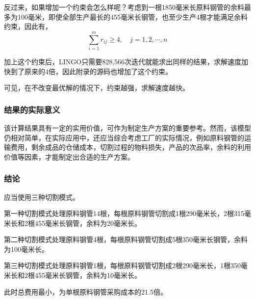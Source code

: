 反过来，如果增加一个约束会怎么样呢？考虑到一根1850毫米长原料钢管的余料最多为100毫米，即使全部生产最长的455毫米长钢管，也至少生产4根才能满足余料约束，因此有，
\begin{equation}
    \sum_{i=1}^m r_{ij} \ge 4, \quad j=1,2,\cdots,n
\end{equation}

加上这个约束后，LINGO只需要828,566次迭代就能求出同样的结果，求解速度加快到了原来的4倍，因此附录的源码也增加了这个约束。

可见，在不改变最优解的情况下，约束越强，求解速度越快。

\subsubsection{结果的实际意义}

该计算结果具有一定的实用价值，可作为制定生产方案的重要参考。然而，该模型仍相对简单，在实际应用中，还应当综合考虑工厂的实际情况，例如原料钢管的运输费用，剩余成品的仓储成本，切割过程的物料损失，产品的次品率，余料的利用价值等因素，才能制定出合适的生产方案。

\subsubsection{结论}

应当使用三种切割模式。

第一种切割模式处理原料钢管14根，每根原料钢管切割成1根290毫米长，2根315毫米长和2根455毫米长钢管，余料为20毫米长。

第二种切割模式处理原料钢管4根，每根原料钢管切割成5根350毫米长钢管，余料为100毫米长。

第三种切割模式处理原料钢管1根，每根原料钢管切割成2根290毫米长，1根350毫米长和2根455毫米长钢管，余料为10毫米长。

此时总费用最小，为单根原料钢管采购成本的21.5倍。
